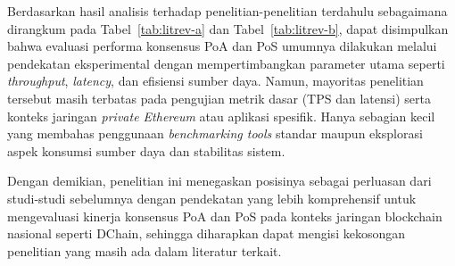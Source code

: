 Berdasarkan hasil analisis terhadap penelitian-penelitian terdahulu sebagaimana dirangkum pada Tabel~\ref{tab:litrev-a} dan Tabel~\ref{tab:litrev-b}, dapat disimpulkan bahwa evaluasi performa konsensus PoA dan PoS umumnya dilakukan melalui pendekatan eksperimental dengan mempertimbangkan parameter utama seperti \textit{throughput}, \textit{latency}, dan efisiensi sumber daya. Namun, mayoritas penelitian tersebut masih terbatas pada pengujian metrik dasar (TPS dan latensi) serta konteks jaringan \textit{private Ethereum} atau aplikasi spesifik. Hanya sebagian kecil yang membahas penggunaan \textit{benchmarking tools} standar maupun eksplorasi aspek konsumsi sumber daya dan stabilitas sistem.

Dengan demikian, penelitian ini menegaskan posisinya sebagai perluasan dari studi-studi sebelumnya dengan pendekatan yang lebih komprehensif untuk mengevaluasi kinerja konsensus PoA dan PoS pada konteks jaringan blockchain nasional seperti DChain, sehingga diharapkan dapat mengisi kekosongan penelitian yang masih ada dalam literatur terkait.

